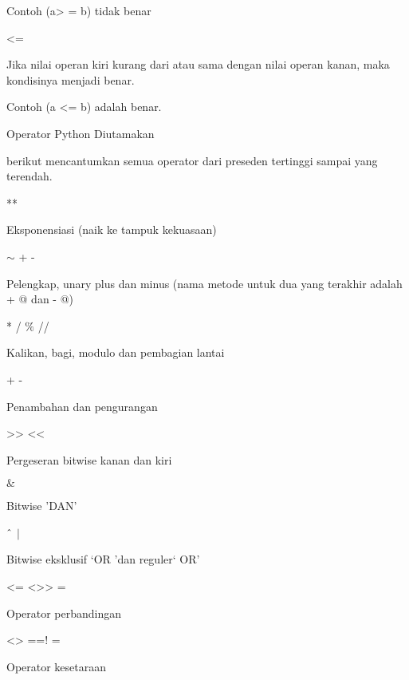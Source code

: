 \noindent 
Contoh (a> = b) tidak benar \par
\vspace{12pt}
\noindent 
<= \par
\noindent 
Jika nilai operan kiri kurang dari atau sama dengan nilai operan kanan, maka kondisinya menjadi benar. \par
\noindent 
Contoh (a <= b) adalah benar. \par
\noindent 
Operator Python Diutamakan \par
\vspace{12pt}
\noindent 
 berikut mencantumkan semua operator dari preseden tertinggi sampai yang terendah. \par
\vspace{12pt}
\noindent 
** \par
\noindent 
Eksponensiasi (naik ke tampuk kekuasaan) \par
\vspace{12pt}
\noindent 
 $  \sim  $ + - \par
\noindent 
Pelengkap, unary plus dan minus (nama metode untuk dua yang terakhir adalah + @ dan - @) \par
\vspace{12pt}
\noindent 
* / $  \%  $ // \par
\noindent 
Kalikan, bagi, modulo dan pembagian lantai \par
\vspace{12pt}
\noindent 
+ - \par
\noindent 
Penambahan dan pengurangan \par
\vspace{12pt}
\noindent 
>> << \par
\noindent 
Pergeseran bitwise kanan dan kiri \par
\vspace{12pt}
\noindent 
 $  \&  $ \par
\noindent 
Bitwise 'DAN' \par
\vspace{12pt}
\noindent 
 $  \string^  $  $  \vert  $ \par
\noindent 
Bitwise eksklusif `OR 'dan reguler` OR' \par
\vspace{12pt}
\noindent 
<= <>> = \par
\noindent 
Operator perbandingan \par
\vspace{12pt}
\noindent 
<> ==! = \par
\noindent 
Operator kesetaraan \par
